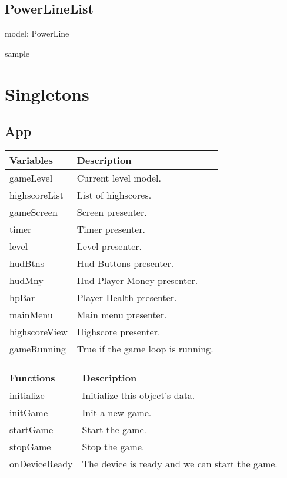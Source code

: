 \subsection*{PowerLineList}

	model: PowerLine

	sample

\clearpage

\section{Singletons}

\subsection*{App}

	\begin{table}[H]
	\begin{tabular}{p{4cm} | p{8cm} }
	\hline
	\rowcolor{gray}
	Variables & Description \\ \hline
	gameLevel & Current level model. \\ \hline
  	highscoreList & List of highscores. \\ \hline
  	gameScreen & Screen presenter. \\ \hline
  	timer & Timer presenter. \\ \hline
  	level & Level presenter. \\ \hline
  	hudBtns & Hud Buttons presenter. \\ \hline
  	hudMny & Hud Player Money presenter. \\ \hline
  	hpBar & Player Health presenter. \\ \hline
  	mainMenu & Main menu presenter. \\ \hline
  	highscoreView & Highscore presenter. \\ \hline
  	gameRunning & True if the game loop is running. \\ \hline
	
	\end{tabular}
	\end{table}

	\begin{table}[H]
	\begin{tabular}{p{4cm} | p{8cm} }
	\hline
	\rowcolor{gray}
	Functions & Description \\ \hline
	initialize & Initialize this object's data. \\ \hline
  	initGame & Init a new game. \\ \hline
  	startGame & Start the game. \\ \hline
  	stopGame & Stop the game. \\ \hline
  	onDeviceReady & The device is ready and we can start the game. \\ \hline

	\end{tabular}
	\end{table}


